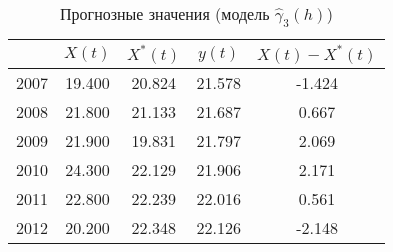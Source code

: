 \begin{table}[H]
\centering
\begin{tabular}{r|cccc}
  \hline
 & $X(t)$ & $X^{*}(t)$ & $y(t)$ & $ X(t) - X^{*}(t) $ \\ 
  \hline
2007 & 19.400 & 20.824 & 21.578 & -1.424 \\ 
  2008 & 21.800 & 21.133 & 21.687 & 0.667 \\ 
  2009 & 21.900 & 19.831 & 21.797 & 2.069 \\ 
  2010 & 24.300 & 22.129 & 21.906 & 2.171 \\ 
  2011 & 22.800 & 22.239 & 22.016 & 0.561 \\ 
  2012 & 20.200 & 22.348 & 22.126 & -2.148 \\ 
   \hline
\end{tabular}
\caption{Прогнозные значения (модель $ \widehat{\gamma}_3(h) $)} 
\label{table:lin-fit-cv-prediction}
\end{table}
